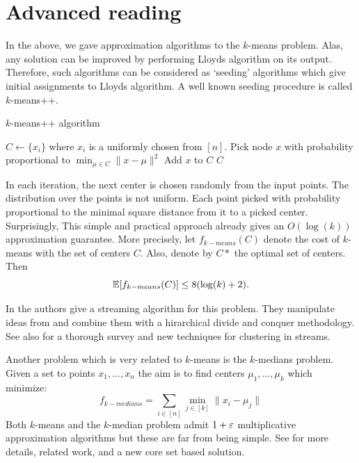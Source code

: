 \documentclass{article}
\begin{document}
\section{Advanced reading}

In the above, we gave approximation algorithms to the $k$-means problem.
Alas, any solution can be improved by performing Lloyds algorithm on its output.
Therefore, such algorithms can be considered as `seeding' algorithms 
which give initial assignments to Lloyds algorithm.
A well known seeding procedure \cite{ArthurV07} is called $k$-means++.
\begin{algorithm}
\caption{$k$-means++ algorithm  \cite{ArthurV07}}
\begin{algorithmic}
\STATE $C \leftarrow \{x_i\}$ where $x_i$ is a uniformly chosen from $[n]$.
	\STATE Pick node $x$ with probability proportional to $\min_{\mu \in C} \|x - \mu\|^2$
	\STATE Add $x$ to $C$
\ENDFOR
{} $C$
\end{algorithmic}
\end{algorithm}
In each iteration, the next center is chosen randomly from the input points.
The distribution over the points is not uniform. 
Each point picked with probability proportional to the minimal square distance from it to a picked center.
Surprisingly, This simple and practical approach already gives an $O(\log(k))$ approximation guarantee.
More precisely, let $f_{k-means}(C)$ denote the cost of $k$-means with the set of centers $C$.
Also, denote by $C*$ the optimal set of centers. Then 
\[
{\mathbb E}[f_{k-means}(C)] \le 8 (\log(k)+2).
\]

In \cite{AilonJM09} the authors give a streaming algorithm for this problem.
They manipulate ideas from \cite{ArthurV07} and combine them with a hirarchical 
divide and conquer methodology. See also \cite{GuhaMMMO03} for a thorough survey and
new techniques for clustering in streams.

Another problem which is very related to $k$-means is the $k$-medians problem.
Given a set to points $x_1,\ldots,x_n$ the aim is to find centers $\mu_1,\ldots,\mu_k$ which minimize:
\[
f_{k-medians} = \sum_{i \in [n]} \min_{j \in [k]} \|x_i - \mu_j \|
\]
Both $k$-means and the $k$-median problem admit $1+\varepsilon$ multiplicative approximation algorithms but these
are far from being simple. See \cite{hk-sckmk-05} for more details, related work, and a new core set based solution. 




\end{document}
